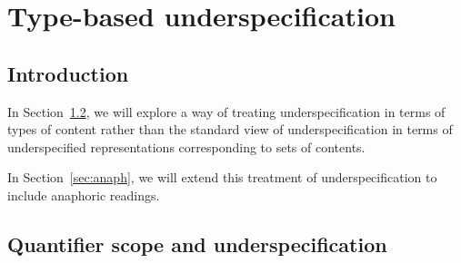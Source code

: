 \chapter{Type-based underspecification}
\label{ch:underspec}
\setcounter{equation}{0}

\section{Introduction}

In Section~\ref{sec:qscope-underspec}, we will explore a way
of treating underspecification in terms of types of content rather
than the standard view of underspecification in terms of
underspecified representations corresponding to sets of contents.

In Section~\ref{sec:anaph}, we will extend this treatment of
underspecification to include anaphoric readings.

\section{Quantifier scope and underspecification}
\label{sec:qscope-underspec}

